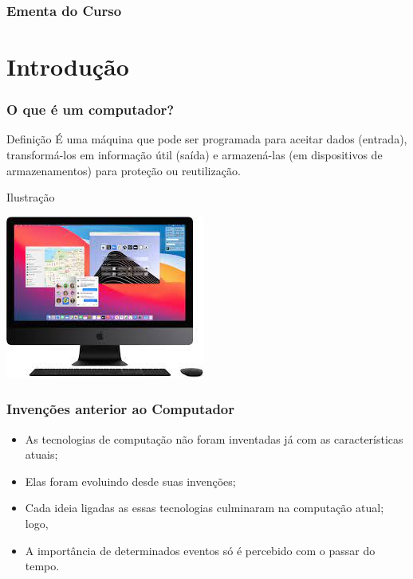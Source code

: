 \documentclass[aspectratio=169]{beamer} %
\begin{document}
\begin{frame}
	\frametitle{Ementa do Curso}
  	\tableofcontents
\end{frame}


\section{Introdução}

\begin{frame}
	\frametitle{O que é um computador?}
	
	\begin{block}{Defini\c cão}
	  É uma máquina que pode ser programada para aceitar dados (entrada), transformá-los em informa\c cão útil (saída) e armazená-las (em dispositivos de armazenamentos) para prote\c cão ou reutiliza\c cão.
	\end{block}\vfill

	\begin{exampleblock}{Ilustra\c cão}
		\begin{center}
			\includegraphics[scale=0.5]{img/computador}
		\end{center}
	\end{exampleblock}	
\end{frame}

\begin{frame}
	\frametitle{Inven\c cões anterior ao Computador}
	
	\begin{itemize}
		\item As tecnologias de computa\c cão não foram inventadas já com as características atuais;
		\item Elas foram evoluindo desde suas inven\c cões;
		\item Cada ideia ligadas as essas tecnologias culminaram na computa\c cão atual; logo,
		\item A importância de determinados eventos só é percebido com o passar do tempo.
	\end{itemize}
\end{frame}
\end{document}
